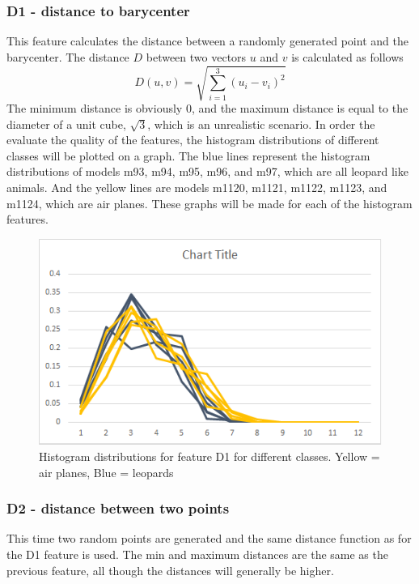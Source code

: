 \documentclass{bigdata}
\begin{document}
\subsubsection{D1 - distance to barycenter}
This feature calculates the distance between a randomly generated point and the barycenter. The distance $D$ between two vectors $u$ and $v$ is calculated as follows
\begin{equation}
D(u,v) = \sqrt{\sum\limits_{i=1}^3 (u_i - v_i)^2}
\end{equation}
The minimum distance is obviously 0, and the maximum distance is equal to the diameter of a unit cube, $\sqrt{3}$, which is an unrealistic scenario.
In order the evaluate the quality of the features, the histogram distributions of different classes will be plotted on a graph. The blue lines represent the histogram distributions of models m93, m94, m95, m96, and m97, which are all leopard like animals. And the yellow lines are models m1120, m1121, m1122, m1123, and m1124, which are air planes. These graphs will be made for each of the histogram features. 

\begin{figure}[h!]
    \includegraphics[width=\linewidth]{Pictures/Part3/D1.png}
    \caption{Histogram distributions for feature D1 for different classes. Yellow = air planes, Blue = leopards}
  \label{fig:eccentricity}
\end{figure}

\subsubsection{D2 - distance between two points}
This time two random points are generated and the same distance function as for the D1 feature is used. The min and maximum distances are the same as the previous feature, all though the distances will generally be higher.
\end{document}
